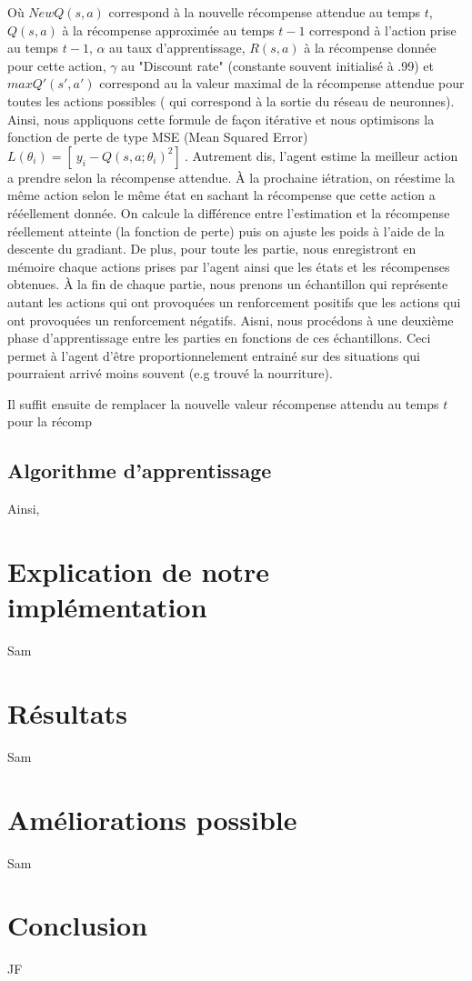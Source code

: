 \documentclass{article}
\begin{document}
Où $NewQ(s,a) $ correspond à la nouvelle récompense attendue au temps $t$, $Q(s,a)$ à la récompense approximée au temps $t-1$ correspond à l'action prise au temps $t-1$, $\alpha$ au taux d'apprentissage, $R(s,a)$ à la récompense donnée pour cette action, $\gamma$ au "Discount rate" (constante souvent initialisé à .99) et $maxQ{'} (s{'},a{'})$ correspond au la valeur maximal de la récompense attendue pour toutes les actions possibles ( qui correspond à la sortie du réseau de neuronnes). Ainsi, nous appliquons cette formule de façon itérative et nous optimisons la fonction de perte de type MSE (Mean Squared Error)  $L( \theta_{i}) = [\ y_{i} - Q(s,a; \theta_{i})^{2} ]\ $. Autrement dis, l'agent estime la meilleur action a prendre selon la récompense attendue. À la prochaine iétration, on réestime la même action selon le même état en sachant la récompense que cette action a rééellement donnée. On calcule la différence entre l'estimation et la récompense réellement atteinte (la fonction de perte) puis on ajuste les poids à l'aide de la descente du gradiant. De plus, pour toute les partie, nous enregistront en mémoire chaque actions prises par l'agent ainsi que les états et les récompenses obtenues. À la fin de chaque partie, nous prenons un échantillon qui représente autant les actions qui ont provoquées un renforcement positifs que les actions qui ont provoquées un renforcement négatifs. Aisni, nous procédons à une deuxième phase d'apprentissage entre les parties en fonctions de ces échantillons. Ceci permet à l'agent d'être proportionnelement entrainé sur des situations qui pourraient arrivé moins souvent (e.g trouvé la nourriture). 




Il suffit ensuite de remplacer la nouvelle valeur récompense attendu au temps $t$ pour la récomp


\subsection{Algorithme d'apprentissage}



Ainsi, 
\section{Explication de notre implémentation}

Sam

\section{Résultats}

Sam

\section{Améliorations possible}

Sam

\section{Conclusion}

JF

\printbibliography
\end{document}
